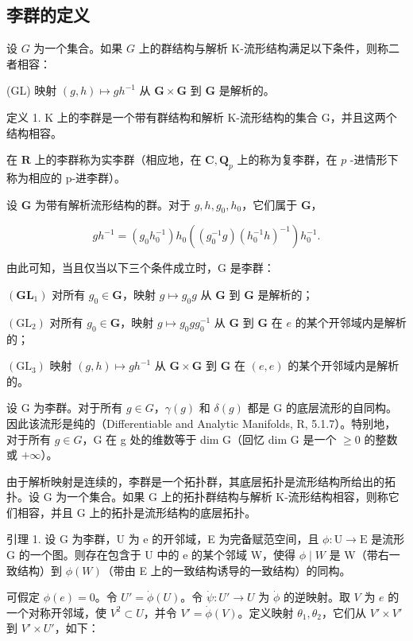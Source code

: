\subsection{李群的定义}

设 \(G\) 为一个集合。如果 \(G\) 上的群结构与解析 K-流形结构满足以下条件，则称二者相容：

(GL) 映射 \((g, h) \mapsto gh^{-1}\) 从 \(\mathbf{G} \times \mathbf{G}\) 到 \(\mathbf{G}\) 是解析的。

定义 1. K 上的李群是一个带有群结构和解析 K-流形结构的集合 G，并且这两个结构相容。

在 \(\mathbf{R}\) 上的李群称为实李群（相应地，在 \(\mathbf{C},\mathbf{Q}_p\) 上的称为复李群，在 \(p\) -进情形下称为相应的 p-进李群）。

设 \(\mathbf{G}\) 为带有解析流形结构的群。对于 \(g, h, g_0, h_0\)，它们属于 \(\mathbf{G}\)，

\[
g h ^ {- 1} = (g _ {0} h _ {0} ^ {- 1}) h _ {0} ((g _ {0} ^ {- 1} g) (h _ {0} ^ {- 1} h) ^ {- 1}) h _ {0} ^ {- 1}.\tag{1}
\]

由此可知，当且仅当以下三个条件成立时，G 是李群：

\((\mathbf{GL}_1)\) 对所有 \(g_0 \in \mathbf{G}\)，映射 \(g \mapsto g_0 g\) 从 \(\mathbf{G}\) 到 \(\mathbf{G}\) 是解析的；

\((\mathrm{GL}_2)\) 对所有 \(g_0 \in \mathbf{G}\)，映射 \(g \mapsto g_0gg_0^{-1}\) 从 \(\mathbf{G}\) 到 \(\mathbf{G}\) 在 \(e\) 的某个开邻域内是解析的；

\((\mathrm{GL}_3)\) 映射 \((g,h)\mapsto gh^{-1}\) 从 \(\mathbf{G}\times \mathbf{G}\) 到 \(\mathbf{G}\) 在 \((e,e)\) 的某个开邻域内是解析的。

设 G 为李群。对于所有 \(g \in G\)，\(\gamma(g)\) 和 \(\delta(g)\) 都是 G 的底层流形的自同构。因此该流形是纯的（Differentiable and Analytic Manifolds, R, 5.1.7）。特别地，对于所有 \(g \in G\)，G 在 g 处的维数等于 dim G（回忆 dim G 是一个 \(\geqslant 0\) 的整数或 \(+\infty\)）。

由于解析映射是连续的，李群是一个拓扑群，其底层拓扑是流形结构所给出的拓扑。设 G 为一个集合。如果 G 上的拓扑群结构与解析 K-流形结构相容，则称它们相容，并且 G 上的拓扑是流形结构的底层拓扑。

引理 1. 设 G 为李群，U 为 e 的开邻域，E 为完备赋范空间，且 \(\phi: \mathrm{U} \to \mathrm{E}\) 是流形 G 的一个图。则存在包含于 U 中的 e 的某个邻域 W，使得 \(\phi \mid W\) 是 W（带右一致结构）到 \(\phi(W)\)（带由 E 上的一致结构诱导的一致结构）的同构。

可假定 \(\phi(e) = 0\)。令 \(U' = \dot{\phi}(U)\)。令 \(\dot{\psi}: U' \to U\) 为 \(\dot{\phi}\) 的逆映射。取 \(V\) 为 \(e\) 的一个对称开邻域，使 \(V^2 \subset U\)，并令 \(V' = \dot{\phi}(V)\)。定义映射 \(\theta_1, \theta_2\)，它们从 \(V' \times V'\) 到 \(V' \times U'\)，如下：

